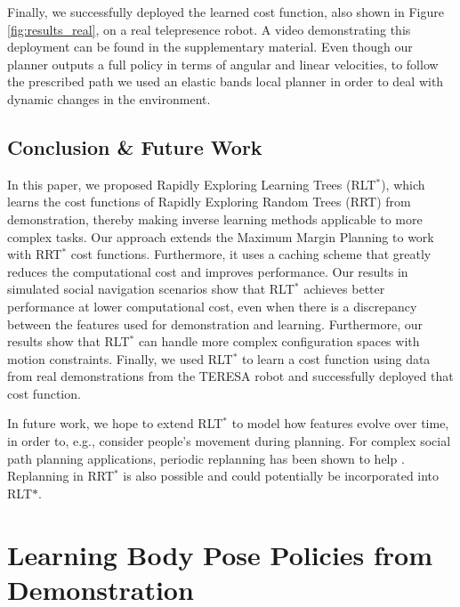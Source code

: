 \documentclass[a4paper,11pt]{report}
\begin{document}
	Finally, we successfully deployed the learned cost function, also shown in Figure \ref{fig:results_real}, on a real telepresence robot. A video demonstrating this deployment can be found in the supplementary material. Even though our planner outputs a full policy in terms of angular and linear velocities, to follow the prescribed path we used an elastic bands local planner in order to deal with dynamic changes in the environment.



\vspace{-1mm}
\subsection{Conclusion \& Future Work}
In this paper, we proposed Rapidly Exploring Learning Trees (RLT$^*$), which learns the cost functions of Rapidly Exploring Random Trees (RRT) from demonstration, thereby making inverse learning methods applicable to more complex tasks. Our approach extends the Maximum Margin Planning to work with RRT$^*$ cost functions. Furthermore, it uses a caching scheme that greatly reduces the computational cost and improves performance. Our results in simulated social navigation scenarios show that RLT$^*$ achieves better performance at lower computational cost, even when there is a discrepancy between the features used for demonstration and learning. Furthermore, our results show that RLT$^*$ can handle more complex configuration spaces with motion constraints. Finally, we used RLT$^*$ to learn a cost function using data from real demonstrations from the TERESA robot and successfully deployed that cost function.

In future work, we hope to extend RLT$^*$ to model how features evolve over time, in order to, e.g., consider people's movement during planning.  For complex social path planning applications, periodic replanning has been shown to help \cite{henry2010learning,vasquez2014inverse}. Replanning in RRT$^*$ is also possible \cite{otte2015rrtx} and could potentially be incorporated into RLT$*$.

\clearpage





\section{Learning Body Pose Policies from Demonstration}
\label{sec:sl_policy}
\end{document}
